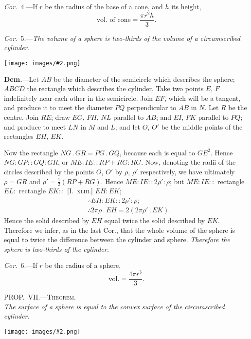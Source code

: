 \documentclass[oneside]{book}
\newcommand\myprop[2]{
\bigskip\Needspace*{4\baselineskip}\begin{center}\textsc{#1}\\\medskip\emph{#2}\par\end{center}
}
\newcommand\imgcent[2]{
\begin{center}
\texttt{[image: images/\#2.png]}
\end{center}
}
\begin{document}
\emph{Cor.}~4.---If $r$ be the radius of the base of a cone, and
$h$ its height,
\[
\text{vol.\ of cone} = \frac{ \pi r^2 h }{3}.
\]

\emph{Cor.}~5.---\textit{The volume of a sphere is two-thirds of the
volume of a circumscribed cylinder.}

\imgcent{200}{f247}

\textbf{Dem.}---Let $AB$ be the diameter of the semicircle
which describes the sphere; $ABCD$ the rectangle which
describes the cylinder. Take two points $E$, $F$ indefinitely
near each other in the semicircle. Join $EF$, which
will be a tangent, and produce it to meet the diameter
$PQ$ perpendicular to $AB$ in $N$. Let $R$ be the centre.
Join $RE$; draw $EG$, $FH$, $NL$ parallel to $AB$; and $EI$,
$FK$ parallel to $PQ$; and produce to meet $LN$ in $M$ and
$L$; and let $O$, $O'$ be the middle points of the rectangles
$EH$, $EK$.

Now the rectangle $NG\,.\,GR = PG\,.\,GQ$, because each
is equal to $GE^{2}$. Hence $NG : GP :: GQ : GR$, or
$ME : IE :: RP+RG : RG$. Now, denoting the radii of
the circles described by the points $O$, $O'$ by $\rho$, $\rho'$ respectively,
we have ultimately $\rho = GR$ and $\rho' =\frac{1}{2}(RP + RG)$.
Hence $ME : IE :: 2\rho' : \rho$; but $ME : IE ::$ rectangle
$EL:$ rectangle $EK ::$ [I.~\textsc{xliii.}] $EH : EK$;
\begin{align*}
&  \therefore EH : EK :: 2\rho' : \rho;  \\
&  \therefore 2\pi\rho \,.\,EH = 2(2\pi\rho' \,.\,EK).
\end{align*}
Hence the solid described by $EH$ equal twice the solid
described by $EK$. Therefore we infer, as in the last
Cor., that the whole volume of the sphere is equal to
twice the difference between the cylinder and sphere.
\emph{Therefore the sphere is two-thirds of the cylinder.}

\emph{Cor.}~6.---If $r$ be the radius of a sphere,
\[
\text{vol.} = \frac{4\pi r^3 }{3}.
\]

\myprop{PROP\@.~VII\@.---Theorem.}{The surface of a sphere\index{Sphere} is equal to the convex surface of
the circumscribed cylinder.}

\imgcent{190}{f248}
\end{document}
